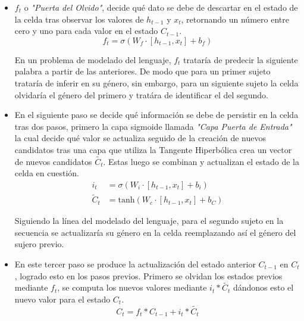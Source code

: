 \documentclass[12pt, letterpaper]{article}
\begin{document}
        \begin{itemize}
            \item $f_t$ o \emph{"Puerta del Olvido"}, decide qué dato se debe de descartar en el estado de la celda tras observar los valores de $h_{t-1}$ y $x_t$, retornando un número entre cero y uno para cada valor en el estado $C_{t-1}$.
            \begin{equation}
                f_t = \sigma(W_f\cdot{[h_{t-1},x_t]} + b_f) 
            \end{equation}

            En un problema de modelado del lenguaje, $f_t$ trataría de predecir la siguiente palabra a partir de las anteriores. De modo que para un primer sujeto trataría de inferir en su género, sin embargo, para un siguiente sujeto la celda olvidaría el género del primero y tratára de identificar el del segundo.

            \item En el siguiente paso se decide qué información se debe de persistir en la celda tras dos pasos, primero la capa sigmoide llamada \emph{"Capa Puerta de Entrada"} la cual decide qué valor se actualiza seguido de la creación de nuevos candidatos tras una capa que utiliza la Tangente Hiperbólica crea un vector de nuevos candidatos $\tilde{C_t}$. Estas luego se combinan y actualizan el estado de la celda en cuestión.
            \begin{equation}
                \begin{aligned}
                    i_t &= \sigma(W_i\cdot{[h_{t-1}, x_t]} + b_i) \\
                    \tilde{C}_t &= \text{tanh}(W_c\cdot{[h_{t-1}, x_t]} +b_C)
                \end{aligned}
            \end{equation}

            Siguiendo la línea del modelado del lenguaje, para el segundo sujeto en la secuencia se actualizaría su género en la celda reemplazando así el género del sujero previo.

            \item En este tercer paso se produce la actualización del estado anterior $C_{t-1}$ en $C_t$, logrado esto en los pasos previos. Primero se olvidan los estados previos mediante $f_t$, se computa los nuevos valores mediante $i_t*\tilde{C_t}$ dándonos esto el nuevo valor para el estado $C_t$. 
            \begin{equation}
                    C_t = f_t* C_{t-1} + i_t*\tilde{C_t}
            \end{equation}


\end{itemize}
\end{document}
